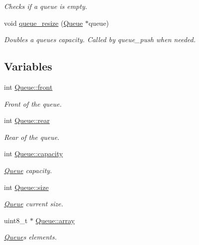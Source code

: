 \begin{DoxyCompactItemize}
\begin{DoxyCompactList}\small\item\em Checks if a queue is empty. \end{DoxyCompactList}\item 
void \mbox{\hyperlink{group__queue_ga017ba4cb33cd9d231b0071fa8d9190cc}{queue\+\_\+resize}} (\mbox{\hyperlink{struct_queue}{Queue}} $\ast$queue)
\begin{DoxyCompactList}\small\item\em Doubles a queue\textquotesingle{}s capacity. Called by queue\+\_\+push when needed. \end{DoxyCompactList}\end{DoxyCompactItemize}
\subsection*{Variables}
\begin{DoxyCompactItemize}
\item 
int \mbox{\hyperlink{group__queue_gaa14801d5c5fea47f3d08483d103e0b57}{Queue\+::front}}
\begin{DoxyCompactList}\small\item\em Front of the queue. \end{DoxyCompactList}\item 
int \mbox{\hyperlink{group__queue_ga8303807ce298d63d958f7e5765034d70}{Queue\+::rear}}
\begin{DoxyCompactList}\small\item\em Rear of the queue. \end{DoxyCompactList}\item 
int \mbox{\hyperlink{group__queue_ga003d8f2aacb10aa84f38ff89e93ccf74}{Queue\+::capacity}}
\begin{DoxyCompactList}\small\item\em \mbox{\hyperlink{struct_queue}{Queue}} capacity. \end{DoxyCompactList}\item 
int \mbox{\hyperlink{group__queue_gac7d9701d244e3ba255ef8556e0562dc6}{Queue\+::size}}
\begin{DoxyCompactList}\small\item\em \mbox{\hyperlink{struct_queue}{Queue}} current size. \end{DoxyCompactList}\item 
uint8\+\_\+t $\ast$ \mbox{\hyperlink{group__queue_ga39d406adce9a616cce11f7c124593c94}{Queue\+::array}}
\begin{DoxyCompactList}\small\item\em \mbox{\hyperlink{struct_queue}{Queue}}\textquotesingle{}s elements. \end{DoxyCompactList}\end{DoxyCompactItemize}


